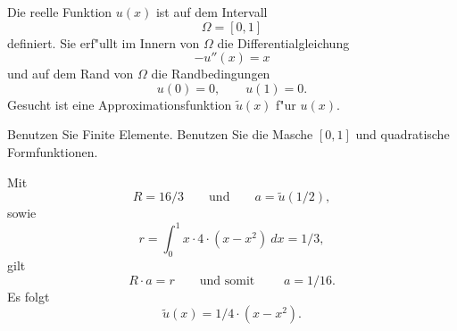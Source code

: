 Die reelle Funktion $u(x)$ ist auf dem Intervall
\[
\Omega = [0, 1]
\]
definiert. Sie erf"ullt im Innern von $\Omega$ die Differentialgleichung 
\[
- u''(x) = x
\]
und auf dem Rand von $\Omega$ die Randbedingungen 
\[
u(0) = 0, \qquad u(1) = 0.
\]
Gesucht ist eine Approximationsfunktion $\tilde u(x)$ f"ur $u(x)$.

\vspace{2mm}

Benutzen Sie Finite Elemente. Benutzen Sie die Masche $[0,1]$ und quadratische Formfunktionen.

\begin{loesung}

Mit
\[
R = 16/3 \qquad \text{und}  \qquad a = \tilde u(1/2), 
\]
sowie
\[
r = \int_0^1 x \cdot 4 \cdot (x - x^2) \ dx = 1/3,
\]
gilt  
\[
R \cdot a = r  \qquad \text{und somit }  \qquad a = 1/16.
\]
Es folgt 
\[
\tilde u(x) = 1/4 \cdot (x - x^2).
\]
\end{loesung}

